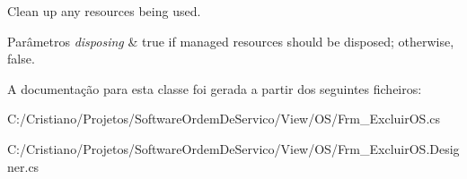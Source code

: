 Clean up any resources being used. 


\begin{DoxyParams}{Parâmetros}
{\em disposing} & true if managed resources should be disposed; otherwise, false.\\
\hline
\end{DoxyParams}


A documentação para esta classe foi gerada a partir dos seguintes ficheiros\+:\begin{DoxyCompactItemize}
\item 
C\+:/\+Cristiano/\+Projetos/\+Software\+Ordem\+De\+Servico/\+View/\+O\+S/Frm\+\_\+\+Excluir\+O\+S.\+cs\item 
C\+:/\+Cristiano/\+Projetos/\+Software\+Ordem\+De\+Servico/\+View/\+O\+S/Frm\+\_\+\+Excluir\+O\+S.\+Designer.\+cs\end{DoxyCompactItemize}
